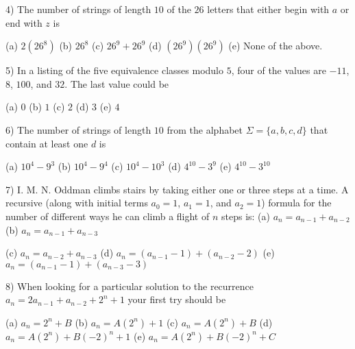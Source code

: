 \documentclass[11pt]{amsart}
\begin{document}
 
\vfill


4) The number of strings of length $10$ of the $26$ letters that either begin with $a$ or end with $z$
\vskip -1pt\hskip 12pt is  

\vskip 5pt
\hskip 20pt (a) $2(26^8)$\hfill
\vskip 5pt
\hskip 20pt (b)  $26^8$\hfill
\vskip 5pt
\hskip 20pt (c) $26^9 + 26^9$\hfill
\vskip 5pt
\hskip 20pt (d) $(26^9)(26^9)$\hfill
\vskip 5pt
\hskip 20pt {\color{red}(e) None of the above.}\hfill

\vfill
\break

5)  In a listing of the five equivalence classes modulo $5$, four of the values
are $-11$, $8$, $100$, and
\vskip -1pt\hskip 12pt $32$. The last value could be

\vskip 5pt
\hskip 20pt (a) $0$\hfill
\vskip 5pt
\hskip 20pt {\color{red}(b) $1$ }\hfill
\vskip 5pt
\hskip 20pt (c) $2$\hfill
\vskip 5pt
\hskip 20pt (d) $3$\hfill
\vskip 5pt
\hskip 20pt (e) $4$\hfill

\vfill

6) The number of strings of length $10$ from the alphabet $\Sigma=\{a,b,c,d\}$ that contain
at least
\vskip -1pt\hskip 12pt  one $d$ is

\vskip 4pt
\hskip 20pt (a) $10^4-9^3$\hfill
\vskip 4pt
\hskip 20pt (b) $10^4 - 9^4$\hfill
\vskip 4pt
\hskip 20pt (c) $10^4-10^3$\hfill
\vskip 4pt
\hskip 20pt (d) $4^{10} - 3^9$\hfill
\vskip 4pt
\hskip 20pt {\color{red}(e) $4^{10}-3^{10}$}\hfill

\vfill

7)  I. M. N.  Oddman climbs stairs by taking either one  or three steps at a time.  
A recursive 
\vskip -1pt\hskip 12pt (along with initial terms $a_{0}=1$, $a_{1}= 1$, and $a_{2}= 1$)
formula for the number of
\vskip -1pt\hskip 12pt  different ways he can climb a
flight of $n$ steps is:
\vskip 3pt
\hskip 20pt (a) $a_n = a_{n-1} + a_{n-2}$\hfill
\vskip 3pt
\hskip 20pt {\color{red}(b) $a_n = a_{n-1} +a_{n-3}$}\hfill

\vskip 3pt
\hskip 20pt (c) $a_n = a_{n-2}+a_{n-3}$\hfill
\vskip 3pt
\hskip 20pt (d) $a_n = (a_{n-1} -1) + (a_{n-2} -2)$\hfill
\vskip 3pt
\hskip 20pt (e) $a_n = (a_{n-1}-1) + (a_{n-3}-3)$\hfill

\vfill

8) When looking for a particular solution to the recurrence $a_n = 2a_{n-1} + a_{n-2} + 2^n + 1$
your 
\vskip -1pt\hskip 12pt first try should be

\vskip 3pt
\hskip 20pt (a) $a_n = 2^n + B$\hfill
\vskip 3pt
\hskip 20pt (b) $a_n = A(2^n) + 1$\hfill
\vskip 3pt
\hskip 20pt {\color{red}(c) $a_n = A(2^n) + B$}\hfill
\vskip 3pt
\hskip 20pt (d) $a_n = A(2^n) + B(-2)^n + 1$\hfill
\vskip 3pt
\hskip 20pt (e) $a_n = A(2^n) + B(-2)^n + C$\hfill
\end{document}
